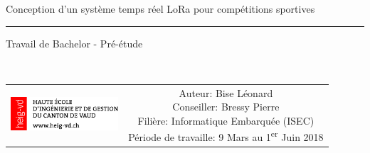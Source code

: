 \begin{titlepage}
\begin{center}
\sffamily


\null\vspace{2cm}
{\huge Conception d'un système temps réel LoRa pour compétitions sportives \\[24pt]

\hrule

\LARGE Travail de Bachelor - Pré-étude} \\[12pt]
    
\vspace{5cm}

\begin{tabular} {cc}
\parbox{0.3\textwidth}{\includegraphics[width=4cm]{images/HEIG-VD.png}}
&
\parbox{0.7\textwidth}{%
\small
%
	Auteur: Bise Léonard\\
	Conseiller: Bressy Pierre\\
	Filière: Informatique Embarquée (ISEC)\\
	Période de travaille: 9 Mars au 1\textsuperscript{er} Juin 2018
%
}
\end{tabular}
\end{center}

\end{titlepage}